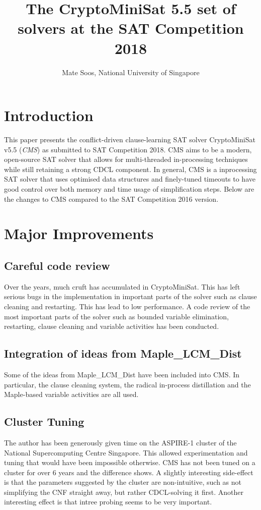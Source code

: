 \documentclass[final]{ieee}
\begin{document}
\title{The CryptoMiniSat 5.5 set of solvers at the SAT Competition 2018}
\author{Mate Soos, National University of Singapore}

\maketitle
\thispagestyle{empty}
\pagestyle{empty}

\section{Introduction}
This paper presents the conflict-driven clause-learning SAT solver CryptoMiniSat v5.5 (\emph{CMS}) as submitted to SAT Competition 2018. CMS aims to be a modern, open-source SAT solver that allows for multi-threaded in-processing techniques while still retaining a strong CDCL component. In general, CMS is a inprocessing SAT solver that uses optimised data structures and finely-tuned timeouts to have good control over both memory and time usage of simplification steps. Below are the changes to CMS compared to the SAT Competition 2016 version.

\section{Major Improvements}
\subsection{Careful code review}
Over the years, much cruft has accumulated in CryptoMiniSat. This has left serious bugs in the implementation in important parts of the solver such as clause cleaning and restarting. This has lead to low performance. A code review of the most important parts of the solver such as bounded variable elimination, restarting, clause cleaning and variable activities has been conducted.

\subsection{Integration of ideas from Maple\_LCM\_Dist}
Some of the ideas from Maple\_LCM\_Dist\cite{maple}\cite{learning-based-maple} have been included into CMS. In particular, the clause cleaning system, the radical in-process distillation and the Maple-based variable activities are all used.

\subsection{Cluster Tuning}
The author has been generously given time on the ASPIRE-1 cluster of the National Supercomputing Centre Singapore\cite{nscc}. This allowed experimentation and tuning that would have been impossible otherwise. CMS has not been tuned on a cluster for over 6 years and the difference shows. A slightly interesting side-effect is that the parameters suggested by the cluster are non-intuitive, such as not simplifying the CNF straight away, but rather CDCL-solving it first. Another interesting effect is that intree probing\cite{HeuleJB13} seems to be very important.
\end{document}

